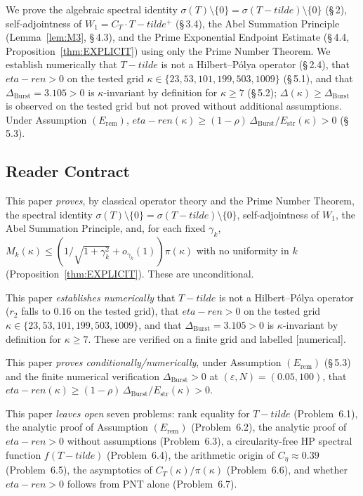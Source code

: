 \documentclass[11pt]{article}
\def\Tt{T-tilde}%
\def\etaren{eta-ren}%
\newcommand{\etaren}{\eta_{\mathrm{ren}}}
\newcommand{\Tt}{\widetilde{T}}
\newcommand{\Ceta}{C_{\eta}}
\newcommand{\CT}{C_{T}}
\newcommand{\Wone}{W_1}
\newcommand{\Dburstvar}{\Delta_{\mathrm{Burst}}}
\begin{document}
We prove the algebraic spectral identity
$\sigma(T)\setminus\{0\}=\sigma(\Tt)\setminus\{0\}$ (\S\,2),
self-adjointness of $\Wone = \CT\cdot\Tt^+$ (\S\,3.4), the Abel
Summation Principle (Lemma~\ref{lem:M3}, \S\,4.3), and the Prime Exponential
Endpoint Estimate (\S\,4.4, Proposition~\ref{thm:EXPLICIT}) using
only the Prime Number Theorem. We establish numerically that $\Tt$
is not a Hilbert--P\'olya operator (\S\,2.4), that $\etaren > 0$
on the tested grid $\kappa\in\{23,53,101,199,503,1009\}$ (\S\,5.1), and that $\Dburstvar=3.105>0$
is $\kappa$-invariant by definition for $\kappa\ge 7$ (\S\,5.2);
$\Delta(\kappa)\ge\Dburstvar$ is observed on the tested grid
but not proved without additional assumptions.
Under Assumption $(E_{\mathrm{rem}})$,
$\etaren(\kappa)\ge(1-\rho)\,\Dburstvar/E_{\mathrm{str}}(\kappa)>0$ (\S\,5.3).

\subsection{Reader Contract}

This paper \emph{proves}, by classical operator theory and the Prime
Number Theorem, the spectral identity
$\sigma(T)\setminus\{0\}=\sigma(\Tt)\setminus\{0\}$,
self-adjointness of $\Wone$,
the Abel Summation Principle, and, for each fixed $\gamma_k$,
$M_k(\kappa)\le(1/\sqrt{1+\gamma_k^2}+o_{\gamma_k}(1))\pi(\kappa)$
with no uniformity in $k$ (Proposition~\ref{thm:EXPLICIT}).
These are unconditional.

This paper \emph{establishes numerically} that $\Tt$ is not a
Hilbert--P\'olya operator ($r_2$ falls to $0.16$ on the tested grid),
that $\etaren > 0$ on the tested grid
$\kappa\in\{23,53,101,199,503,1009\}$,
and that $\Dburstvar=3.105>0$ is
$\kappa$-invariant by definition for $\kappa\ge 7$.
These are verified on a finite grid and labelled
[numerical].

This paper \emph{proves conditionally/numerically}, under
Assumption $(E_{\mathrm{rem}})$ (\S\,5.3) and the finite numerical
verification $\Dburstvar>0$ at $(\varepsilon,N)=(0.05,100)$,
that $\etaren(\kappa)\ge(1-\rho)\,\Dburstvar/E_{\mathrm{str}}(\kappa)>0$.

This paper \emph{leaves open} seven problems: rank equality for $\Tt$
(Problem~6.1), the analytic proof of Assumption $(E_{\mathrm{rem}})$ (Problem~6.2),
the analytic proof of $\etaren > 0$ without assumptions (Problem~6.3),
a circularity-free HP spectral function $f(\Tt)$ (Problem~6.4), the
arithmetic origin of $\Ceta\approx 0.39$ (Problem~6.5), the
asymptotics of $\CT(\kappa)/\pi(\kappa)$ (Problem~6.6), and whether
$\etaren > 0$ follows from PNT alone (Problem~6.7).
\end{document}
